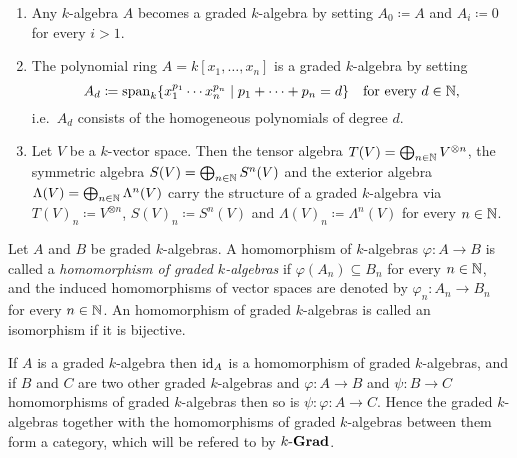 \begin{expls}\label{expls: graded algebras}
 \begin{enumerate}[leftmargin=*]
  \item
   Any $k$-algebra $A$ becomes a graded $k$-algebra by setting $A_0 \coloneqq A$ and $A_i \coloneqq 0$ for every $i > 1$.
  \item
   The polynomial ring $A = k[x_1, \dotsc, x_n]$ is a graded $k$-algebra by setting
   \[
    A_d \coloneqq \operatorname{span}_k \{ x_1^{p_1} \dotsm x_n^{p_n} \mid p_1 + \dotsb + p_n = d\}
    \quad \text{for every $d \in \mathbb{N}$},
   \]
   i.e.\ $A_d$ consists of the homogeneous polynomials of degree $d$.
  \item
   Let $V$ be a $k$-vector space. Then the tensor algebra $T(V) = \bigoplus_{n \in \mathbb{N}} V^{\otimes n}$, the symmetric algebra $S(V) = \bigoplus_{n \in \mathbb{N}} S^n(V)$ and the exterior algebra $\Lambda(V) = \bigoplus_{n \in \mathbb{N}} \Lambda^n(V)$ carry the structure of a graded $k$-algebra via $T(V)_n \coloneqq V^{\otimes n}$, $S(V)_n \coloneqq S^n(V)$ and $\Lambda(V)_n \coloneqq \Lambda^n(V)$ for every $n \in \mathbb{N}$.
 \end{enumerate}
\end{expls}


\begin{defi}
 Let $A$ and $B$ be graded $k$-algebras. A homomorphism of $k$-algebras $\varphi \colon A \to B$ is called a \emph{homomorphism of graded $k$-algebras} if $\varphi(A_n) \subseteq B_n$ for every $n \in \mathbb{N}$, and the induced homomorphisms of vector spaces are denoted by $\varphi_n \colon A_n \to B_n$ for every $n \in \mathbb{N}$. An homomorphism of graded $k$-algebras is called an isomorphism if it is bijective.
\end{defi}


\begin{rem}
 If $A$ is a graded $k$-algebra then $\operatorname{id}_A$ is a homomorphism of graded $k$-algebras, and if $B$ and $C$ are two other graded $k$-algebras and $\varphi \colon A \to B$ and $\psi \colon B \to C$ homomorphisms of graded $k$-algebras then so is $\psi \colon \varphi \colon A \to C$. Hence the graded $k$-algebras together with the homomorphisms of graded $k$-algebras between them form a category, which will be refered to by $k\text{-}\mathbf{Grad}$.
\end{rem}


